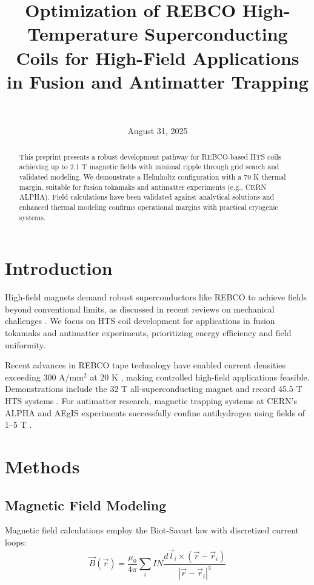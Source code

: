 \documentclass[12pt,a4paper]{article}
\title{Optimization of REBCO High-Temperature Superconducting Coils for High-Field Applications in Fusion and Antimatter Trapping}
\author{\authorname\\\texttt{\authoremail}}
\date{August 31, 2025}
\begin{document}
\maketitle

\begin{abstract}
This preprint presents a robust development pathway for REBCO-based HTS coils achieving up to 2.1 T magnetic fields with minimal ripple through grid search and validated modeling. We demonstrate a Helmholtz configuration with a 70 K thermal margin, suitable for fusion tokamaks and antimatter experiments (e.g., CERN ALPHA). Field calculations have been validated against analytical solutions and enhanced thermal modeling confirms operational margins with practical cryogenic systems.
\end{abstract}

\section{Introduction}

High-field magnets demand robust superconductors like REBCO to achieve fields beyond conventional limits, as discussed in recent reviews on mechanical challenges \cite{zhou2023}. We focus on HTS coil development for applications in fusion tokamaks and antimatter experiments, prioritizing energy efficiency and field uniformity.

Recent advances in REBCO tape technology have enabled current densities exceeding 300 A/mm$^2$ at 20 K \cite{superpower2022}, making controlled high-field applications feasible. Demonstrations include the 32 T all-superconducting magnet \cite{zhai2020} and record 45.5 T HTS systems \cite{hahn2019}. For antimatter research, magnetic trapping systems at CERN's ALPHA and AEgIS experiments successfully confine antihydrogen using fields of 1--5 T \cite{alpha2023,aegis2018}.

\section{Methods}

\subsection{Magnetic Field Modeling}

Magnetic field calculations employ the Biot-Savart law with discretized current loops:
\begin{equation}
\vec{B}(\vec{r}) = \frac{\mu_0}{4\pi} \sum_{i} I N \frac{d\vec{l}_i \times (\vec{r} - \vec{r}_i)}{|\vec{r} - \vec{r}_i|^3}
\end{equation}
\end{document}
